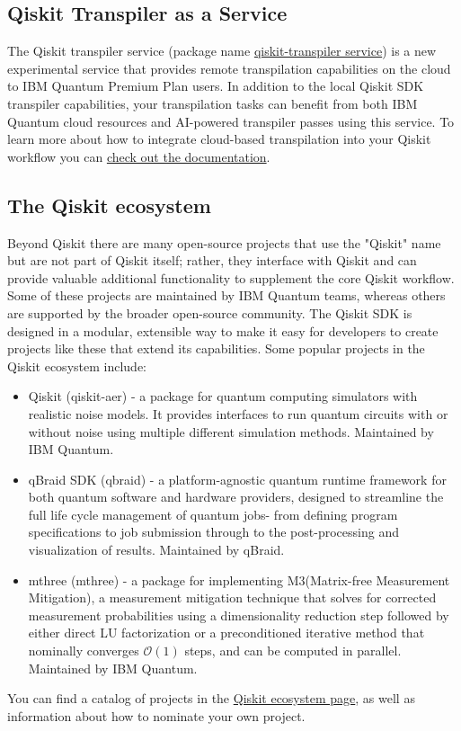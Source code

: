 \subsection{Qiskit Transpiler as a Service}
The Qiskit transpiler service (package name \href{https://pypi.org/project/qiskit-transpiler-service/}{qiskit-transpiler service}) is a new experimental service that provides remote transpilation capabilities on the cloud to IBM Quantum Premium Plan users. In addition to the local Qiskit SDK transpiler capabilities, your transpilation tasks can benefit from both IBM Quantum cloud resources and AI-powered transpiler passes using this service. To learn more about how to integrate cloud-based transpilation into your Qiskit workflow you can \href{https://docs.quantum.ibm.com/guides/qiskit-transpiler-service}{check out the documentation}.

\subsection{The Qiskit ecosystem}
Beyond Qiskit there are many open-source projects that use the "Qiskit" name but are not part of Qiskit itself; rather, they interface with Qiskit and can provide valuable additional functionality to supplement the core Qiskit workflow. Some of these projects are maintained by IBM Quantum teams, whereas others are supported by the broader open-source community. The Qiskit SDK is designed in a modular, extensible way to make it easy for developers to create projects like these that extend its capabilities.
Some popular projects in the Qiskit ecosystem include:
\begin{itemize}
    \item Qiskit (qiskit-aer) - a package for quantum computing simulators with realistic noise models. It provides interfaces to run quantum circuits with or without noise using multiple different simulation methods. Maintained by IBM Quantum.
    \item qBraid SDK (qbraid) - a platform-agnostic quantum runtime framework for both quantum software and hardware providers, designed to streamline the full life cycle management of quantum jobs- from defining program specifications to job submission through to the post-processing and visualization of results. Maintained by qBraid.
    \item mthree (mthree) - a package for implementing M3(Matrix-free Measurement Mitigation), a measurement mitigation technique that solves for corrected measurement probabilities using a dimensionality reduction step followed by either direct LU factorization or a preconditioned iterative method that nominally converges $\mathcal{O}(1)$ steps, and can be computed in parallel. Maintained by IBM Quantum.
\end{itemize}
You can find a catalog of projects in the \href{https://qiskit.github.io/ecosystem/}{Qiskit ecosystem page}, as well as information about how to nominate your own project.

